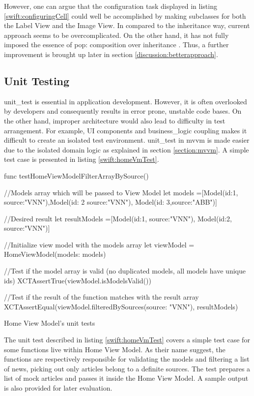 \documentclass[11pt,a4paper,oneside,article]{memoir}
\begin{document}
However, one can argue that the configuration task displayed in listing \ref{swift:configuringCell} could well be accomplished by making subclasses for both the Label View and the Image View. In compared to the inheritance way, current approach seems to be overcomplicated. On the other hand, it has not fully imposed the essence of \gls{pop}: composition over inheritance \cite[p. 17]{java:design}. Thus, a further improvement is brought up later in section \ref{discussion:betterapproach}. 

\subsection{Unit Testing}
\Gls{unit_test} is essential in application development. However, it is often overlooked by developers and consequently results in error prone, unstable code bases. On the other hand, improper architecture would also lead to difficulty in test arrangement. For example, UI components and \gls{business_logic} coupling makes it difficult to create an isolated test environment. \Gls{unit_test} in \gls{mvvm} is made easier due to the isolated domain logic as explained in section \ref{section:mvvm}. A simple test case is presented in listing \ref{swift:homeVmTest}.

\begin{listing}[H]
\begin{SwiftCode}
func testHomeViewModelFilterArrayBySource(){
    //Models array which will be passed to View Model
    let models =[Model(id:1, source:"VNN"),Model(id: 2 source:"VNN"), Model(id: 3,source:"ABB")]
    
    //Desired result
    let resultModels =[Model(id:1, source:"VNN"), Model(id:2, source:"VNN")]
    
    //Initialize view model with the models array
    let viewModel = HomeViewModel(models: models)
       
    //Test if the model array is valid (no duplicated models, all models have unique ids)
    XCTAssertTrue(viewModel.isModelsValid())
    
    //Test if the result of the function matches with the result array
    XCTAssertEqual(viewModel.filteredBySources(source: "VNN"), resultModels)        
}
\end{SwiftCode}
\caption{Home View Model's unit tests}
\label{swift:homeVmTest}
\end{listing}

The unit test described in listing \ref{swift:homeVmTest} covers a simple test case for some functions live within Home View Model. As their name suggest, the functions are respectively responsible for validating the models and filtering a list of news, picking out only articles belong to a definite sources. The test prepares a list of mock articles and passes it inside the Home View Model. A sample  output is also provided for later evaluation. 
\end{document}
